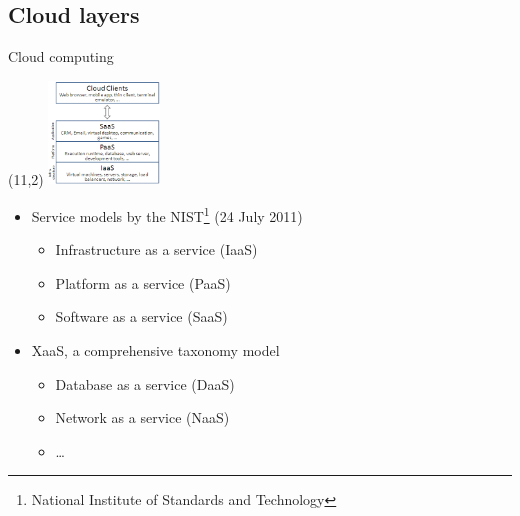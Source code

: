 \subsection{Cloud layers}
\begin{frame}{Cloud computing}
  \begin{textblock}{}(11,2)
      \includegraphics[width=8em]{img/Cloud_computing_layers}
  \end{textblock}
  \begin{itemize}
    \item Service models by the NIST\footnote{National Institute of Standards and Technology} (24 July 2011)
      \begin{itemize}
        \item Infrastructure as a service (IaaS)
        \medskip
        \item Platform as a service (PaaS)
        \medskip
        \item Software as a service (SaaS)
        \medskip
      \end{itemize}
    \item XaaS, a comprehensive taxonomy model
      \begin{itemize}
        \item Database as a service (DaaS)
        \medskip
        \item Network as a service (NaaS)
        \medskip
        \item …
      \end{itemize}
  \end{itemize}
\end{frame}

